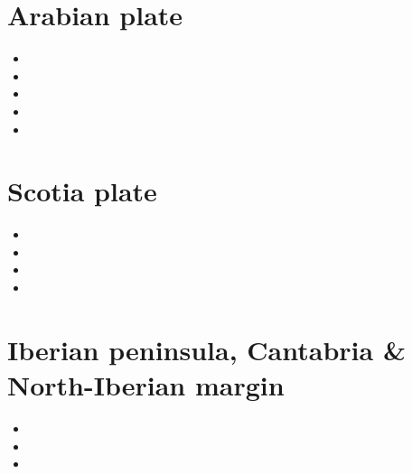 \section{Arabian plate}

\begin{small}
\begin{itemize}
\item[\twothousandthirteen] 
\item[\twothousandfifteen] 
\item[\twothousandeighteen] 
\item[\twothousandtwenty] 
\item[\twothousandtwentytwo] 
\end{itemize}
\end{small}

\section{Scotia plate}

\begin{small}
\begin{itemize}
\item[\twothousandthirteen]
\item[\twothousandtwenty]
\item[\twothousandtwentyone]
\item[\twothousandtwentythree]
\end{itemize}
\end{small}

\section{Iberian peninsula, Cantabria \& North-Iberian margin}

\begin{small}
\begin{itemize}
\item[\nineteenninetysix]
\item[\twothousandtwo]
\item[\twothousandfifteen]
\end{itemize}
\end{small}


